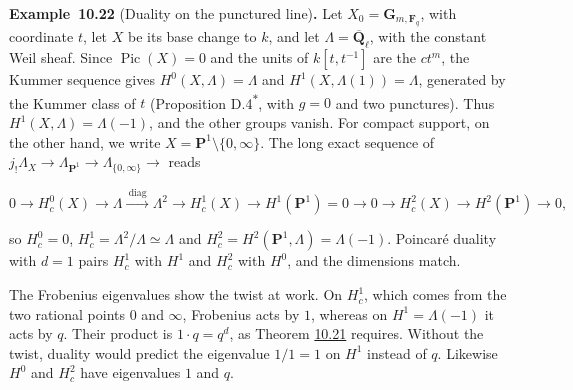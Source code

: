 \documentclass[11pt]{article}
\newenvironment{bpstatement}[2]{\par\addvspace{0.6\baselineskip}\noindent\textbf{#1}#2\textbf{.}\enspace\ignorespaces}
  {\par\addvspace{0.4\baselineskip}}
\newcommand{\bpout}[1]{#1\textsuperscript{\hyperlink{bp-outside}{\ensuremath{\ast}}}}
\begin{document}
\label{bp68}%
\begin{bpstatement}{Example~10.22}{ (Duality on the punctured line)}
Let \(X_0=\mathbf G_{m,\mathbf F_q}\), with coordinate \(t\), let \(X\) be its base change to \(k\), and let \(\Lambda=\overline{\mathbf Q}_\ell\), with the constant Weil sheaf. Since \(\operatorname{Pic}(X)=0\) and the units of \(k[t,t^{-1}]\) are the \(ct^m\), the Kummer sequence gives \(H^0(X,\Lambda)=\Lambda\) and \(H^1(X,\Lambda(1))=\Lambda\), generated by the Kummer class of \(t\) (Proposition \bpout{D.4}, with \(g=0\) and two punctures). Thus \(H^1(X,\Lambda)=\Lambda(-1)\), and the other groups vanish. For compact support, on the other hand, we write \(X=\mathbf P^1\setminus\{0,\infty\}\). The long exact sequence of \(j_!\Lambda_X\to\Lambda_{\mathbf P^1}\to\Lambda_{\{0,\infty\}}\to\) reads

\[
0\to H^0_c(X)\to\Lambda\xrightarrow{\ \text{diag}\ }\Lambda^2\to H^1_c(X)
\to H^1(\mathbf P^1)=0\to0\to H^2_c(X)\to H^2(\mathbf P^1)\to0,
\]

so \(H^0_c=0\), \(H^1_c=\Lambda^2/\Lambda\simeq\Lambda\) and \(H^2_c=H^2(\mathbf P^1,\Lambda)=\Lambda(-1)\). Poincaré duality with \(d=1\) pairs \(H^1_c\) with \(H^1\) and \(H^2_c\) with \(H^0\), and the dimensions match.

The Frobenius eigenvalues show the twist at work. On \(H^1_c\), which comes from the two rational points \(0\) and \(\infty\), Frobenius acts by \(1\), whereas on \(H^1=\Lambda(-1)\) it acts by \(q\). Their product is \(1\cdot q=q^d\), as Theorem \hyperref[bp65]{10.21} requires. Without the twist, duality would predict the eigenvalue \(1/1=1\) on \(H^1\) instead of \(q\). Likewise \(H^0\) and \(H^2_c\) have eigenvalues \(1\) and \(q\).
\end{bpstatement}
\end{document}
